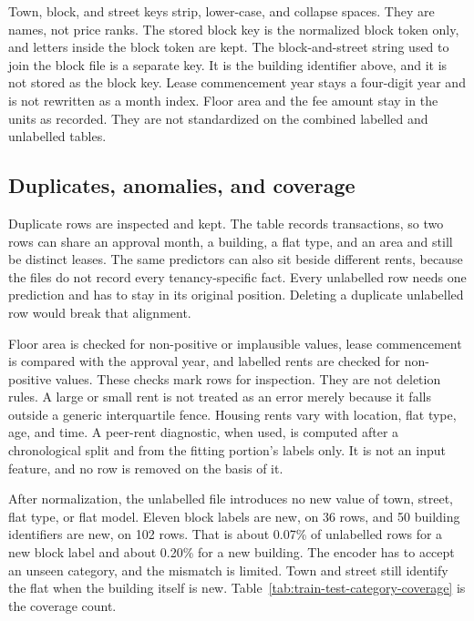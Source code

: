 \documentclass[11pt,a4paper]{article}
\begin{document}
Town, block, and street keys strip, lower-case, and collapse spaces.
They are names, not price ranks.
The stored block key is the normalized block token only, and letters inside the block token are kept.
The block-and-street string used to join the block file is a separate key.
It is the building identifier above, and it is not stored as the block key.
Lease commencement year stays a four-digit year and is not rewritten as a month index.
Floor area and the fee amount stay in the units as recorded.
They are not standardized on the combined labelled and unlabelled tables.

\subsection{Duplicates, anomalies, and coverage}

Duplicate rows are inspected and kept.
The table records transactions, so two rows can share an approval month, a building, a flat type, and an area and still be distinct leases.
The same predictors can also sit beside different rents, because the files do not record every tenancy-specific fact.
Every unlabelled row needs one prediction and has to stay in its original position.
Deleting a duplicate unlabelled row would break that alignment.

Floor area is checked for non-positive or implausible values, lease commencement is compared with the approval year, and labelled rents are checked for non-positive values.
These checks mark rows for inspection.
They are not deletion rules.
A large or small rent is not treated as an error merely because it falls outside a generic interquartile fence.
Housing rents vary with location, flat type, age, and time.
A peer-rent diagnostic, when used, is computed after a chronological split and from the fitting portion's labels only.
It is not an input feature, and no row is removed on the basis of it.

After normalization, the unlabelled file introduces no new value of town, street, flat type, or flat model.
Eleven block labels are new, on 36 rows, and 50 building identifiers are new, on 102 rows.
That is about 0.07\% of unlabelled rows for a new block label and about 0.20\% for a new building.
The encoder has to accept an unseen category, and the mismatch is limited.
Town and street still identify the flat when the building itself is new.
Table~\ref{tab:train-test-category-coverage} is the coverage count.
\end{document}
